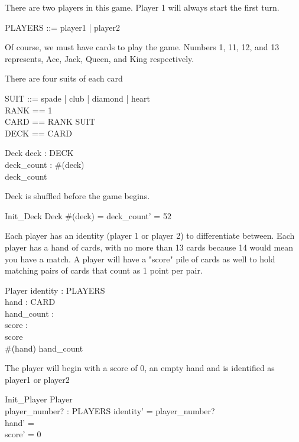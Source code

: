\documentclass{article}
\begin{document}
There are two players in this game. Player 1 will always start the first turn.
\begin{zed} 
    PLAYERS ::= player1 | player2\\
\end{zed}

Of course, we must have cards to play the game.
Numbers 1, 11, 12, and 13 represents, Ace, Jack, Queen, and King respectively.

There are four suits of each card
\begin{zed}
    SUIT ::= spade | club | diamond | heart \\
    RANK == 1 \\
    CARD == RANK \cross SUIT \\
    DECK == \seq CARD
\end{zed}

\begin{schema}{Deck}
    deck : DECK \\
    deck\_count : \nat
    \where
    \#(deck)  \\  
    deck\_count 
\end{schema}

Deck is shuffled before the game begins.
\begin{schema}{Init\_Deck}
    \Delta Deck
    \where
    \#(deck) = deck\_count' = 52 \\
\end{schema}

Each player has an identity (player 1 or player 2) to
differentiate between. Each player has a hand of cards, with
no more than 13 cards because 14 would mean you have a match.
A player will have a "score" pile of cards as well to hold
matching pairs of cards that count as 1 point per pair.

\begin{schema}{Player}
    identity : PLAYERS \\
    hand : \power CARD \\
    hand\_count : \nat \\
    score : \nat \\
    \where
    score  \\
    \#(hand)  \land hand\_count  \\
\end{schema}

The player will begin with a score of 0, an empty hand
and is identified as player1 or player2
\begin{schema}{Init\_Player}
    \Delta Player \\
    player\_number? : PLAYERS
    \where
    identity' = player\_number?\\
    hand' = \emptyset \\
    score' = 0 \\
\end{schema}
\end{document}
